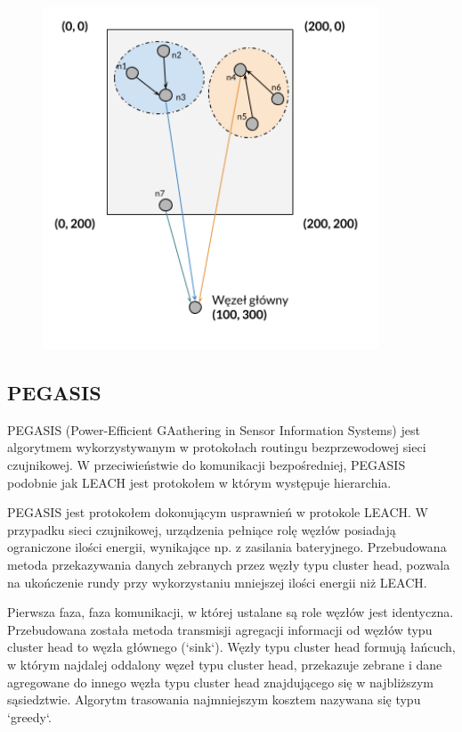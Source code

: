 \documentclass[a4paper,12pt,twoside,openany]{report}
\begin{document}
\begin{figure}[H]
 \centering
 \includegraphics[width=10cm]{images/komunikacja_leach.png} 
\end{figure}

\subsection{PEGASIS}

PEGASIS (Power-Efficient GAathering in Sensor Information Systems) jest algorytmem wykorzystywanym w protokołach routingu bezprzewodowej sieci czujnikowej.
W przeciwieństwie do komunikacji bezpośredniej, PEGASIS podobnie jak LEACH jest protokołem w którym występuje hierarchia.

PEGASIS jest protokołem dokonującym usprawnień w protokole LEACH. W przypadku sieci czujnikowej, urządzenia pełniące rolę węzłów posiadają ograniczone ilości energii, wynikające np. z zasilania bateryjnego.
Przebudowana metoda przekazywania danych zebranych przez węzły typu cluster head, pozwala na ukończenie rundy przy wykorzystaniu mniejszej ilości energii niż LEACH.

Pierwsza faza, faza komunikacji, w której ustalane są role węzłów jest identyczna. Przebudowana została metoda transmisji agregacji informacji od węzłów typu cluster head to węzła głównego (`sink`).
Węzły typu cluster head formują łańcuch, w którym najdalej oddalony węzeł typu cluster head, przekazuje zebrane i dane agregowane do innego węzła typu cluster head znajdującego się w najbliższym 
sąsiedztwie. Algorytm trasowania najmniejszym kosztem nazywana się typu `greedy`. 
\end{document}
